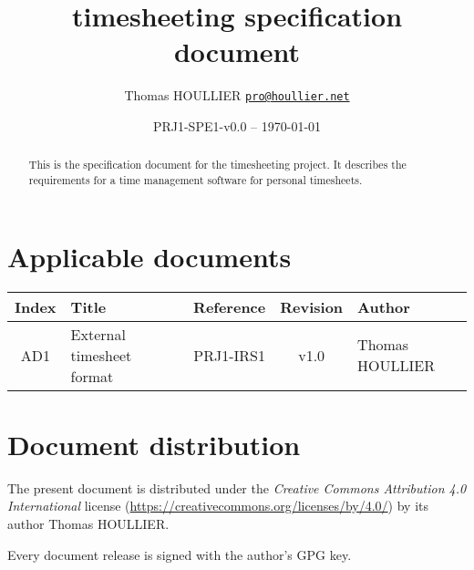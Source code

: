 \documentclass[letterpaper]{article}
\title{timesheeting specification document}
\author{Thomas HOULLIER \href{mailto:pro@houllier.net}
         {\texttt{\textlangle pro@houllier.net\textrangle}}}
\begin{document}
\frenchspacing
\date{PRJ1-SPE1-v0.0 -- \today}
\maketitle
\thispagestyle{FirstPage}

\begin{abstract}
  This is the specification document for the timesheeting project.
  It describes the requirements for a time management software for
  personal timesheets.
\end{abstract}

\begin{versionhistory}
\end{versionhistory}
\setcounter{table}{0} %

\section*{Applicable documents}
{ \centering
\begin{tabularx}{\textwidth}{| c | X | c | c | X |} \hline
  Index & Title & Reference & Revision & Author \\ \hline
  AD1   & External timesheet format & PRJ1-IRS1 & v1.0 & Thomas HOULLIER \\
  \hline \end{tabularx} \par }

\section*{Document distribution}
The present document is distributed under the \emph{Creative Commons Attribution
4.0 International} license (\url{https://creativecommons.org/licenses/by/4.0/})
by its author Thomas HOULLIER.

Every document release is signed with the author's GPG key.

\tableofcontents
\printglossary[type=\acronymtype,style=index]
\pagestyle{plain}




\appendix


\apptocmd{\thebibliography}{\raggedright}{}{}
\begingroup
{}
\setlength\bibitemsep{0pt}
\printbibliography
\endgroup
\end{document}
